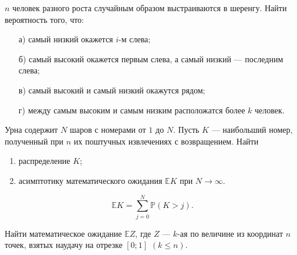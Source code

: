 


\begin{problem}
$n$ человек разного роста случайным образом выстраиваются в шеренгу. Найти вероятность того, что: 
\begin{enumerate}
\item[а)] самый низкий окажется $i$-м слева; 
\item[б)] самый высокий окажется первым слева, а самый низкий --- последним слева; 
\item[в)] самый высокий и самый низкий окажутся рядом; 
\item[г)] между самым высоким и самым низким расположатся более $k$ человек. 
\end{enumerate}
\end{problem}


\begin{problem}
Урна содержит $N$ шаров с номерами от $1$ до $N$. Пусть $K$ --- наибольший номер, полученный при $n$ их поштучных извлечениях 
с возвращением. Найти 
\begin{enumerate}
\item распределение $K$;
\item асимптотику математического ожидания ${\mathbb E}K$ при $N\to\infty$. 
\end{enumerate}
\end{problem}

\begin{ordre}
\[
{\mathbb E}K=\sum\limits_{j=0}^{N} {\mathbb P}(K>j).
\]
\end{ordre}

\begin{problem}
Найти математическое ожидание ${\mathbb E}Z$, где $Z$ --- $k$-ая по величине из координат $n$ точек, взятых наудачу на отрезке 
$[0;1]$ $(k \leqslant n)$. 
\end{problem}

